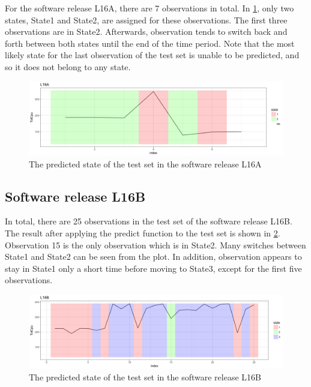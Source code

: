 For the software release L16A, there are 7 observations in total.
In \ref{predict_L16A}, only two states, State1 and State2, are assigned
for these observations. The first three observations are in State2.
Afterwards, observation tends to switch back and forth between both
states until the end of the time period. Note that the most likely
state for the last observation of the test set is unable to be predicted,
and so it does not belong to any state.

\begin{figure}[h]
\begin{centering}
\includegraphics[scale=0.35]{picture/predict_L16A1}
\par\end{centering}
\caption{The predicted state of the test set in the software release L16A }

\label{predict_L16A}
\end{figure}


\subsection{Software release L16B}

In total, there are 25 observations in the test set of the software
release L16B. The result after applying the predict function to the
test set is shown in \ref{predict_L16B}. Observation 15 is the only
observation which is in State2. Many switches between State1 and State2
can be seen from the plot. In addition, observation appears to stay
in State1 only a short time before moving to State3, except for the
first five observations. 

\begin{figure}[h]
\begin{centering}
\includegraphics[scale=0.35]{picture/predict_L16B1}
\par\end{centering}
\caption{The predicted state of the test set in the software release L16B}

\label{predict_L16B}
\end{figure}


